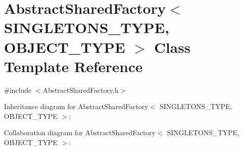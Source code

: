 \hypertarget{class_abstract_shared_factory}{\section{Abstract\+Shared\+Factory$<$ S\+I\+N\+G\+L\+E\+T\+O\+N\+S\+\_\+\+T\+Y\+P\+E, O\+B\+J\+E\+C\+T\+\_\+\+T\+Y\+P\+E $>$ Class Template Reference}
\label{class_abstract_shared_factory}
}


{\ttfamily \#include $<$Abstract\+Shared\+Factory.\+h$>$}



Inheritance diagram for Abstract\+Shared\+Factory$<$ S\+I\+N\+G\+L\+E\+T\+O\+N\+S\+\_\+\+T\+Y\+P\+E, O\+B\+J\+E\+C\+T\+\_\+\+T\+Y\+P\+E $>$\+:


Collaboration diagram for Abstract\+Shared\+Factory$<$ S\+I\+N\+G\+L\+E\+T\+O\+N\+S\+\_\+\+T\+Y\+P\+E, O\+B\+J\+E\+C\+T\+\_\+\+T\+Y\+P\+E $>$\+:
